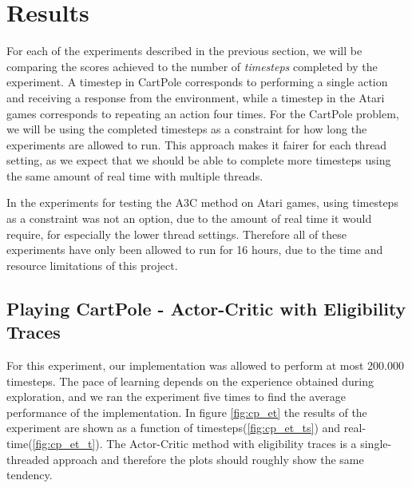\documentclass[11pt]{article}
\begin{document}
\section{Results}

For each of the experiments described in the previous section, we will be comparing the
scores achieved to the number of \textit{timesteps} completed by the experiment. 
A timestep in CartPole corresponds to performing a single action and receiving a response
from the environment, while a timestep in the Atari games corresponds to repeating an action
four times.
For the CartPole problem, we will be using the completed timesteps as a constraint for
how long the experiments are allowed to run.
This approach makes it fairer for each thread setting, as we expect 
that we should be able to complete more timesteps using the same amount of real time
with multiple threads.

In the experiments for testing the A3C method on Atari games, using timesteps as a constraint
was not an option, due to the amount of real time it would require, for especially the lower thread settings.
Therefore all of these experiments have only been allowed to run for 16 hours,
due to the time and resource limitations of this project.

\subsection{Playing CartPole - Actor-Critic with Eligibility Traces}

For this experiment, our implementation was allowed to perform at most 200.000 timesteps.
The pace of learning depends on the experience obtained during exploration,
and we ran the experiment five times to find the average performance of
the implementation.
In figure \ref{fig:cp_et} the results of the experiment are shown
as a function of timesteps(\ref{fig:cp_et_ts}) and real-time(\ref{fig:cp_et_t}).
The Actor-Critic method with eligibility traces is a single-threaded
approach and therefore the plots should roughly show the same tendency.
\end{document}
